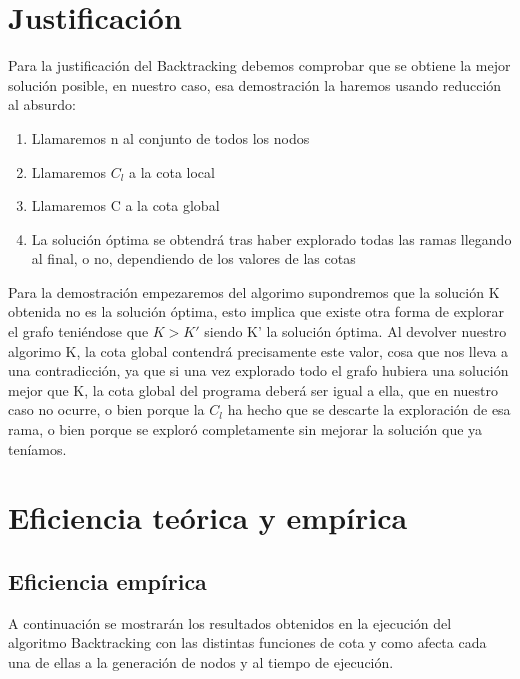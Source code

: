 \documentclass[11pt,openany]{book}
\begin{document}
\section{Justificación}
Para la justificación del Backtracking debemos comprobar que se obtiene la mejor solución posible, en nuestro caso, esa demostración la haremos usando reducción al absurdo:
\begin{enumerate}
    \item Llamaremos n al conjunto de todos los nodos
    \item Llamaremos $C_l$ a la cota local 
    \item Llamaremos C a la cota global
    \item La solución óptima se obtendrá tras haber explorado todas las ramas llegando al final, o no, dependiendo de los valores de las cotas
\end{enumerate}
Para la demostración empezaremos del algorimo supondremos que la solución K obtenida no es la solución óptima, esto implica que existe otra forma de explorar el grafo teniéndose que $K>K'$ siendo K' la solución óptima.
Al devolver nuestro algorimo K, la cota global contendrá precisamente este valor, cosa que nos lleva a una contradicción, ya que si una vez explorado todo el grafo hubiera una solución mejor que K, la cota global del programa deberá ser igual 
a ella, que en nuestro caso no ocurre, o bien porque la $C_l$ ha hecho que se descarte la exploración de esa rama, o bien porque se exploró completamente sin mejorar la solución que ya teníamos.

\section{Eficiencia teórica y empírica}
\subsection{Eficiencia empírica}
A continuación se mostrarán los resultados obtenidos en la ejecución del algoritmo Backtracking con las distintas funciones de cota y como afecta cada una de ellas a la generación de nodos y al tiempo de ejecución.
\end{document}
